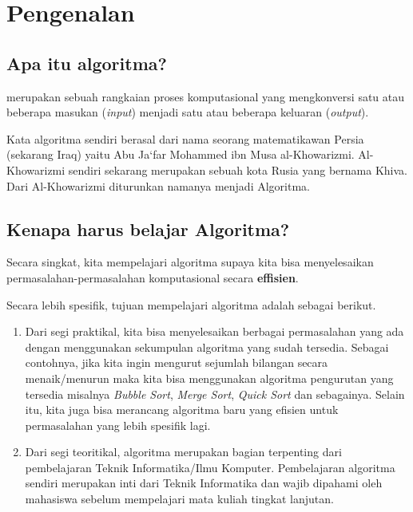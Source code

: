 \chapter{Pengenalan}\label{ch:pengantarAlgoritma}


\section{Apa itu algoritma?}
 merupakan sebuah rangkaian proses komputasional yang mengkonversi satu atau beberapa masukan (\textit{input}) menjadi satu atau beberapa keluaran (\textit{output}). 

Kata algoritma sendiri berasal dari nama seorang matematikawan Persia (sekarang Iraq) yaitu Abu Ja`far Mohammed ibn Musa al-Khowarizmi. Al-Khowarizmi sendiri sekarang merupakan sebuah kota Rusia yang bernama Khiva. Dari Al-Khowarizmi diturunkan namanya menjadi Algoritma.

\section{Kenapa harus belajar Algoritma?}
Secara singkat, kita mempelajari algoritma supaya kita bisa menyelesaikan permasalahan-permasalahan komputasional secara \textbf{effisien}.  

Secara lebih spesifik, tujuan mempelajari algoritma adalah sebagai berikut.
\begin{enumerate}
	\item Dari segi praktikal, kita bisa menyelesaikan berbagai permasalahan yang ada dengan menggunakan sekumpulan algoritma yang sudah tersedia. Sebagai contohnya, jika kita ingin mengurut sejumlah bilangan secara menaik/menurun maka kita bisa menggunakan algoritma pengurutan yang tersedia misalnya \textit{Bubble Sort}, \textit{Merge Sort}, \textit{Quick Sort} dan sebagainya. Selain itu, kita juga bisa merancang algoritma baru yang efisien untuk permasalahan yang lebih spesifik lagi.
	\item Dari segi teoritikal, algoritma merupakan bagian terpenting dari pembelajaran Teknik Informatika/Ilmu Komputer. Pembelajaran algoritma sendiri merupakan inti dari Teknik Informatika dan wajib dipahami oleh mahasiswa sebelum mempelajari mata kuliah tingkat lanjutan.
\end{enumerate}

